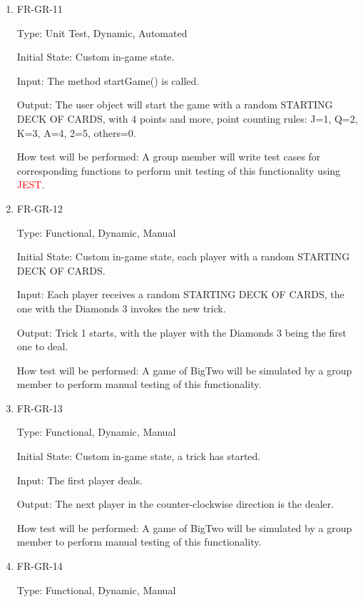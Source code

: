 \documentclass[12pt, titlepage]{article}
\begin{document}
\begin{enumerate}

\item{FR-GR-11\\}

Type: Unit Test, Dynamic, Automated
					
Initial State: Custom in-game state.
					
Input: The method startGame() is called.
					
Output: The user object will start the game with a random STARTING DECK OF CARDS, with 4 points and more, point counting rules:  J=1, Q=2, K=3, A=4, 2=5, others=0.
					
How test will be performed: A group member will write test cases for corresponding functions to perform unit testing of this functionality using \textcolor{red}{JEST}.

\item{FR-GR-12\\}

Type: Functional, Dynamic, Manual
					
Initial State: Custom in-game state, each player with a random STARTING DECK OF CARDS.
					
Input: Each player receives a random STARTING DECK OF CARDS, the one with the Diamonds 3 invokes the new trick.
					
Output: Trick 1 starts, with the player with the Diamonds 3 being the first one to deal.
					
How test will be performed: A game of BigTwo will be simulated by a group member to perform manual testing of this functionality.

\item{FR-GR-13\\}

Type: Functional, Dynamic, Manual
					
Initial State: Custom in-game state, a trick has started.
					
Input: The first player deals.
					
Output: The next player in the counter-clockwise direction is the dealer.
					
How test will be performed: A game of BigTwo will be simulated by a group member to perform manual testing of this functionality.

\item{FR-GR-14\\}

Type: Functional, Dynamic, Manual
					

\end{enumerate}
\end{document}
